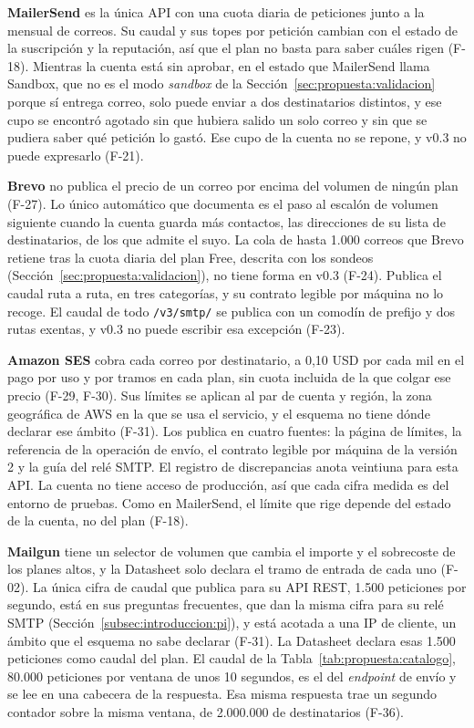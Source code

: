 \textbf{MailerSend} \citep{mailersendpricing} es la única API con una cuota diaria de peticiones junto a la mensual de correos.
Su caudal y sus topes por petición cambian con el estado de la suscripción y la reputación, así que el plan no basta para saber cuáles rigen (F-18).
Mientras la cuenta está sin aprobar, en el estado que MailerSend llama Sandbox, que no es el modo \textit{sandbox} de la Sección~\ref{sec:propuesta:validacion} porque sí entrega correo, solo puede enviar a dos destinatarios distintos, y ese cupo se encontró agotado sin que hubiera salido un solo correo y sin que se pudiera saber qué petición lo gastó.
Ese cupo de la cuenta no se repone, y v0.3 no puede expresarlo (F-21).

\textbf{Brevo} \citep{brevopricing} no publica el precio de un correo por encima del volumen de ningún plan (F-27).
Lo único automático que documenta es el paso al escalón de volumen siguiente cuando la cuenta guarda más contactos, las direcciones de su lista de destinatarios, de los que admite el suyo.
La cola de hasta 1.000 correos que Brevo retiene tras la cuota diaria del plan Free, descrita con los sondeos (Sección~\ref{sec:propuesta:validacion}), no tiene forma en v0.3 (F-24).
Publica el caudal ruta a ruta, en tres categorías, y su contrato legible por máquina no lo recoge.
El caudal de todo \texttt{/v3/smtp/} se publica con un comodín de prefijo y dos rutas exentas, y v0.3 no puede escribir esa excepción (F-23).

\textbf{Amazon SES} \citep{sespricing} cobra cada correo por destinatario, a 0,10 USD por cada mil en el pago por uso y por tramos en cada plan, sin cuota incluida de la que colgar ese precio (F-29, F-30).
Sus límites se aplican al par de cuenta y región, la zona geográfica de AWS en la que se usa el servicio, y el esquema no tiene dónde declarar ese ámbito (F-31).
Los publica en cuatro fuentes: la página de límites, la referencia de la operación de envío, el contrato legible por máquina de la versión 2 y la guía del relé SMTP.
El registro de discrepancias anota veintiuna para esta API.
La cuenta no tiene acceso de producción, así que cada cifra medida es del entorno de pruebas.
Como en MailerSend, el límite que rige depende del estado de la cuenta, no del plan (F-18).

\textbf{Mailgun} \citep{mailgunpricing} tiene un selector de volumen que cambia el importe y el sobrecoste de los planes altos, y la Datasheet solo declara el tramo de entrada de cada uno (F-02).
La única cifra de caudal que publica para su API REST, 1.500 peticiones por segundo, está en sus preguntas frecuentes, que dan la misma cifra para su relé SMTP (Sección~\ref{subsec:introduccion:pi}), y está acotada a una IP de cliente, un ámbito que el esquema no sabe declarar (F-31).
La Datasheet declara esas 1.500 peticiones como caudal del plan.
El caudal de la Tabla~\ref{tab:propuesta:catalogo}, 80.000 peticiones por ventana de unos 10 segundos, es el del \textit{endpoint} de envío y se lee en una cabecera de la respuesta.
Esa misma respuesta trae un segundo contador sobre la misma ventana, de 2.000.000 de destinatarios (F-36).

